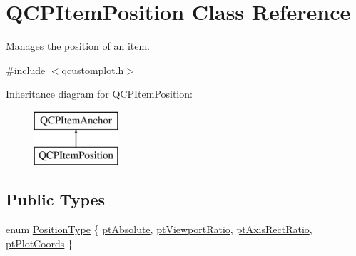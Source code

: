 \hypertarget{class_q_c_p_item_position}{}\section{Q\+C\+P\+Item\+Position Class Reference}
\label{class_q_c_p_item_position}


Manages the position of an item.  




{\ttfamily \#include $<$qcustomplot.\+h$>$}

Inheritance diagram for Q\+C\+P\+Item\+Position\+:\begin{figure}[H]
\begin{center}
\leavevmode
\includegraphics[height=2.000000cm]{d1/dad/class_q_c_p_item_position}
\end{center}
\end{figure}
\subsection*{Public Types}
\begin{DoxyCompactItemize}
\item 
enum \mbox{\hyperlink{class_q_c_p_item_position_aad9936c22bf43e3d358552f6e86dbdc8}{Position\+Type}} \{ \mbox{\hyperlink{class_q_c_p_item_position_aad9936c22bf43e3d358552f6e86dbdc8a564f5e53e550ead1ec5fc7fc7d0b73e0}{pt\+Absolute}}, 
\mbox{\hyperlink{class_q_c_p_item_position_aad9936c22bf43e3d358552f6e86dbdc8ac7d6aa89ceacb39658b0d6da061c789a}{pt\+Viewport\+Ratio}}, 
\mbox{\hyperlink{class_q_c_p_item_position_aad9936c22bf43e3d358552f6e86dbdc8a01080fd00eaf09fa238ef6b73bbfef75}{pt\+Axis\+Rect\+Ratio}}, 
\mbox{\hyperlink{class_q_c_p_item_position_aad9936c22bf43e3d358552f6e86dbdc8ad5ffb8dc99ad73263f7010c77342294c}{pt\+Plot\+Coords}}
 \}
\end{DoxyCompactItemize}
